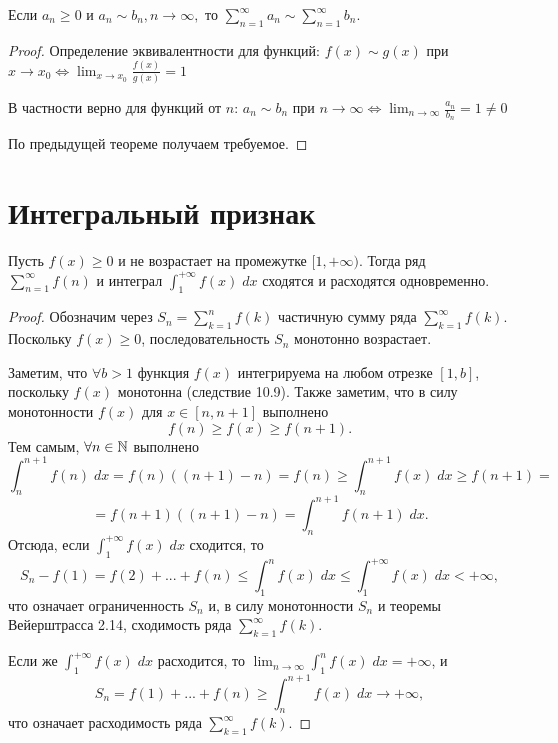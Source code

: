 	\begin{corollary}
		Если $a_n \geqslant 0$ и $a_n \sim b_n, n \rightarrow \infty,$ то $\displaystyle \sum_{n = 1}^{\infty} a_n \sim \sum_{n = 1}^{\infty} b_n$.
	\end{corollary}
	
	\begin{proof}
		Определение эквивалентности для функций:
		$f(x) \sim g(x)$ при $x \to x_0 \Leftrightarrow \lim_{x \to x_0} \frac{f(x)}{g(x)} = 1$
		
		В частности верно для функций от $n$: 
		$a_n \sim b_n$ при $n \to \infty \Leftrightarrow \lim_{n \to \infty} \frac{a_n}{b_n} = 1 \neq 0$
		
		По предыдущей теореме получаем требуемое.
	\end{proof}
	
	\section{Интегральный признак}
	
	\begin{sentence}
		Пусть $f(x) \geqslant 0$ и не возрастает на промежутке $[1, +\infty)$. Тогда ряд $\displaystyle \sum_{n = 1}^{\infty} f(n)$ и интеграл $\displaystyle \int_1^{+\infty} f(x) \; dx$ сходятся и расходятся одновременно. 
	\end{sentence}
	
	\begin{proof}
		Обозначим через $\displaystyle S_n = \sum_{k = 1}^n f(k)$ частичную сумму ряда $\displaystyle \sum_{k = 1}^{\infty} f(k)$. Поскольку $f(x) \geqslant 0$, последовательность $S_n$ монотонно возрастает.
		
		Заметим, что $\forall b > 1$ функция $f(x)$ интегрируема на любом отрезке $[1, b]$, поскольку $f(x)$ монотонна (следствие 10.9). Также заметим, что в силу монотонности $f(x)$ для $x \in [n, n + 1]$ выполнено
		\[ f(n) \geqslant f(x) \geqslant f(n + 1). \]
		Тем самым, $\forall n \in \mathbb N$ выполнено
		\[ \int_n^{n + 1} f(n) \; dx = f(n)((n + 1) - n) = f(n) \geqslant \int_n^{n + 1} f(x) \; dx \geqslant f(n + 1) = \]
		\[ =  f(n + 1)((n + 1) - n) = \int_n^{n + 1} f(n + 1) \; dx. \]
		Отсюда, если $\int_1^{+\infty} f(x) \; dx$ сходится, то
		\[ S_n - f(1) = f(2) + ... + f(n) \leqslant \int_1^n f(x) \; dx \leqslant \int_1^{+\infty} f(x) \; dx < +\infty, \]
		что означает ограниченность $S_n$ и, в силу монотонности $S_n$ и теоремы Вейерштрасса 2.14, сходимость ряда $\displaystyle \sum_{k = 1}^{\infty} f(k)$.
		
		Если же $\int_1^{+\infty} f(x) \; dx$ расходится, то $\displaystyle \lim_{n \to \infty} \int_1^n f(x) \; dx = +\infty$, и
		\[ S_n = f(1) + ... + f(n) \geqslant \int_n^{n + 1} f(x) \; dx \to +\infty, \]
		что означает расходимость ряда $\displaystyle \sum_{k = 1}^{\infty} f(k)$.
	\end{proof}
	
